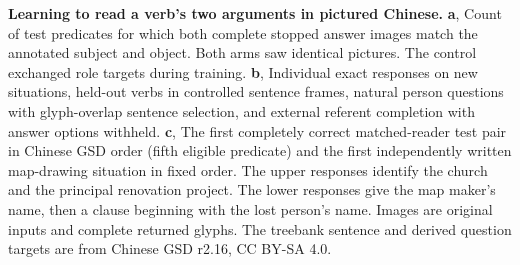 \textbf{Learning to read a verb's two arguments in pictured Chinese.}
\textbf{a}, Count of test predicates for which both complete stopped answer images match the annotated subject and object. Both arms saw identical pictures. The control exchanged role targets during training.
\textbf{b}, Individual exact responses on new situations, held-out verbs in controlled sentence frames, natural person questions with glyph-overlap sentence selection, and external referent completion with answer options withheld.
\textbf{c}, The first completely correct matched-reader test pair in Chinese GSD order (fifth eligible predicate) and the first independently written map-drawing situation in fixed order. The upper responses identify the church and the principal renovation project. The lower responses give the map maker's name, then a clause beginning with the lost person's name. Images are original inputs and complete returned glyphs. The treebank sentence and derived question targets are from Chinese GSD r2.16, CC BY-SA 4.0.
